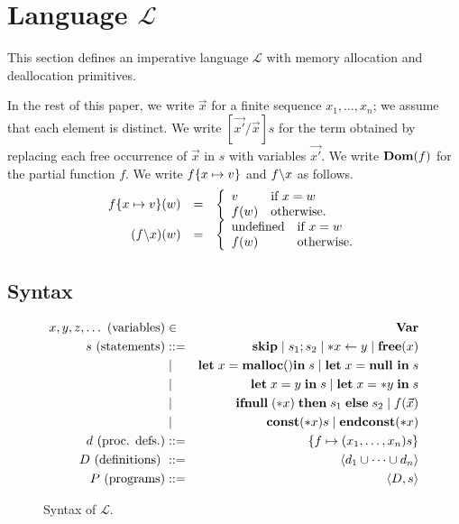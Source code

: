 \section{Language \(\mathcal{L}\)}\label{sec:language}

This section defines an imperative language \(\mathcal{L}\) with memory
allocation and deallocation primitives.  

In the rest of this paper, we write \(\vec{x}\) for a finite sequence
\(x_1,\dots,x_n\); we assume that each element is distinct.  We write
\([\vec{x'}/\vec{x}]s\) for the term obtained by replacing each free
occurrence of \(\vec{x}\) in $s$ with variables \(\vec{x'}\).  We write
\(\mathbf{Dom}(f)\) for the partial function $f$.  We write \(f \{x \mapsto
v\}\) and \(f \backslash x\) as follows.
\[
\begin{array}{rcl}
f \{x \mapsto v\} (w) &=&
\left\{
\begin{array}{ll}
v & \mbox{if \(x = w\)}\\
f(w) & \mbox{otherwise.}
\end{array}
\right.\\
(f \backslash x)(w) &=&
\left\{
\begin{array}{ll}
\mbox{undefined} & \mbox{if \(x = w\)}\\
f(w) & \mbox{otherwise.}
\end{array}
\right.
\end{array}
\]


\subsection{Syntax}

\begin{figure*}[t]
 \begin{eqnarray*}
  x,y,z,\dots \mbox{ (variables)} &\in& \mathbf{Var}\\
  s \mbox{ (statements)} & ::= &  \mathbf{skip} \mid s_{1};s_{2} \mid *x \leftarrow y \mid \mathbf{free}(x) \\
  & \mid & \mathbf{let}\; x = \mathbf{malloc()} \mathbf{in}\; s \mid \mathbf{let}\; x = \mathbf{null}\ \mathbf{in}\; s  \\
  & \mid & \mathbf{let}\; x = y \; \mathbf{in}\; s \mid   \mathbf{let}\; x = *y \; \mathbf{in}\; s \\
  & \mid & \mathbf{ifnull}\;(*x) \; \mathbf{then}\; s_{1}\; \mathbf{else}\; s_{2} \mid f(\vec{x})\\
  & \mid & \mathbf{const}(*x) s \mid \mathbf{endconst}(*x)  \\
  d \mbox{ (proc. defs.)} & ::= & \{f \mapsto (x_1,\dots,x_n)s\}\\
  D \mbox{ (definitions) } &::=& \langle d_1 \cup \dots \cup d_n \rangle\\
  P \mbox{ (programs)} &::=& \langle D, s \rangle\\
 \end{eqnarray*}
\caption{Syntax of $\mathcal{L}$.} \label{fig:syntax}
\end{figure*}

